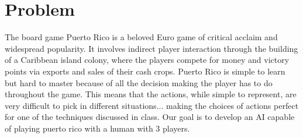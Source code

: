 
\chapter{Problem}

The board game Puerto Rico is a beloved Euro game of critical acclaim and widespread popularity.  It involves indirect player interaction through the building of a Caribbean island colony, where the players compete for money and victory points via exports and sales of their cash crops. Puerto Rico is simple to learn but hard to master because of all the decision making the player has to do throughout the game.  This means that the actions, while simple to represent, are very difficult to pick in different situations... making the choices of actions perfect for one of the techniques discussed in class.  Our goal is to develop an AI capable of playing puerto rico with a human with 3 players. 
 



